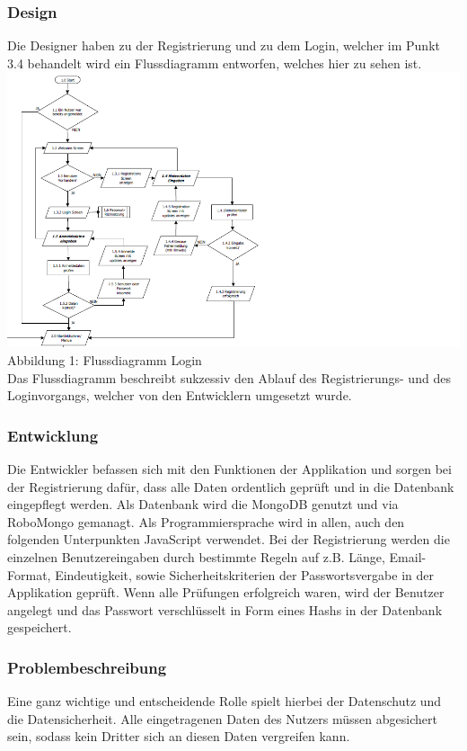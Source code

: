 \documentclass[12pt,a4paper]{article}
\begin{document}
\subsubsection*{Design}
Die Designer haben zu der Registrierung und zu dem Login, welcher im Punkt 3.4 behandelt wird ein Flussdiagramm entworfen, welches hier zu sehen ist.
\includegraphics[scale=0.6, origin=l]{Login-Registrierung.png}
\footnotesize Abbildung 1: Flussdiagramm Login
\normalsize
\\
\linebreak
Das Flussdiagramm beschreibt sukzessiv den Ablauf des Registrierungs- und des Loginvorgangs, welcher von den Entwicklern umgesetzt wurde.
\subsubsection*{Entwicklung}
Die Entwickler befassen sich mit den Funktionen der Applikation  und sorgen bei der Registrierung dafür, dass alle Daten ordentlich geprüft und in die Datenbank eingepflegt werden.
Als Datenbank wird die MongoDB genutzt und via RoboMongo gemanagt. Als Programmiersprache wird in allen, auch den folgenden Unterpunkten JavaScript verwendet.
Bei der Registrierung werden die einzelnen Benutzereingaben durch bestimmte Regeln auf z.B. Länge, Email-Format, Eindeutigkeit, sowie Sicherheitskriterien der Passwortsvergabe in der Applikation geprüft.
Wenn alle Prüfungen erfolgreich waren, wird der Benutzer angelegt und das Passwort verschlüsselt in Form eines Hashs in der Datenbank gespeichert.
\subsubsection*{Problembeschreibung} 
Eine ganz wichtige und entscheidende Rolle spielt hierbei der Datenschutz und die Datensicherheit. Alle eingetragenen Daten des Nutzers müssen abgesichert sein, sodass kein Dritter sich an diesen Daten vergreifen kann.
\newpage
\end{document}
